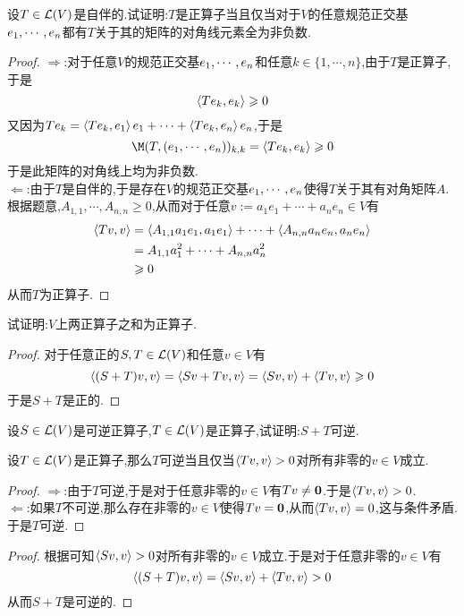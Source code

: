 \documentclass{ctexart}
\begin{document}
\begin{problem}[5.]
    设$T\in\mathcal{L}(V)$是自伴的.试证明:$T$是正算子当且仅当对于$V$的任意规范正交基${e}_1,\cdots,{e}_{n}$都有$T$关于其的矩阵的对角线元素全为非负数.
\end{problem}
\begin{proof}
    $\Rightarrow$:对于任意$V$的规范正交基${e}_1,\cdots,{e}_{n}$和任意$k\in\{1,\cdots,n\}$,由于$T$是正算子,于是
    \[\left\langle{Te_k},{e_k}\right\rangle\geqslant0\]
    又因为$Te_k=\left\langle{Te_k},{e_1}\right\rangle e_1+\cdots+\left\langle{Te_k},{e_n}\right\rangle e_n$,于是
    \[\M(T,(\li e,n))_{k,k}=\inprod{Te_k}{e_k}\geqslant0\]
    于是此矩阵的对角线上均为非负数.\\
    $\Leftarrow$:由于$T$是自伴的,于是存在$V$的规范正交基${e}_1,\cdots,{e}_{n}$使得$T$关于其有对角矩阵$A$.\\
    根据题意,$A_{1,1},\cdots,A_{n,n}\geqslant0$,从而对于任意$v:=a_1e_1+\cdots+a_ne_n\in V$有
    \[\begin{aligned}
        \left\langle{Tv},{v}\right\rangle
        &= \left\langle{A_{1,1}a_1e_1},{a_1e_1}\right\rangle+\cdots+\left\langle{A_{n,n}a_ne_n},{a_ne_n}\right\rangle \\
        &= A_{1,1}a_1^2+\cdots+A_{n,n}a_n^2 \\
        &\geqslant 0
    \end{aligned}\]
    从而$T$为正算子.
\end{proof}
\begin{problem}[6.]
    试证明:$V$上两正算子之和为正算子.
\end{problem}
\begin{proof}
    对于任意正的$S,T\in\mathcal{L}(V)$和任意$v\in V$有
    \[\left\langle{(S+T)v},{v}\right\rangle=\left\langle{Sv+Tv},{v}\right\rangle=\left\langle{Sv},{v}\right\rangle+\left\langle{Tv},{v}\right\rangle\geqslant 0\]
    于是$S+T$是正的.
\end{proof}
\begin{problem}[7.]
    设$S\in\mathcal{L}(V)$是可逆正算子,$T\in\mathcal{L}(V)$是正算子,试证明:$S+T$可逆.
\end{problem}
\begin{lemma}[Lemma.L.11]
    设$T\in\mathcal{L}(V)$是正算子,那么$T$可逆当且仅当$\left\langle{Tv},{v}\right\rangle>0$对所有非零的$v\in V$成立.
\end{lemma}
\begin{proof}
    $\Rightarrow$:由于$T$可逆,于是对于任意非零的$v\in V$有$Tv\neq\mathbf0$.于是$\left\langle{Tv},{v}\right\rangle>0$.\\
    $\Leftarrow$:如果$T$不可逆,那么存在非零的$v\in V$使得$Tv=\mathbf0$,从而$\left\langle{Tv},{v}\right\rangle=0$,这与条件矛盾.于是$T$可逆.
\end{proof}
\begin{proof}
    根据可知$\left\langle{Sv},{v}\right\rangle>0$对所有非零的$v\in V$成立.于是对于任意非零的$v\in V$有
    \[\left\langle{(S+T)v},{v}\right\rangle=\left\langle{Sv},{v}\right\rangle+\left\langle{Tv},{v}\right\rangle>0\]
    从而$S+T$是可逆的.
\end{proof}
\end{document}
